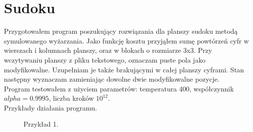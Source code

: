 \documentclass{article}
\begin{document}
    \clearpage
    \section{Sudoku}
        Przygotowałem program poszukujący rozwiązania dla planszy sudoku metodą symulowanego wyżarzania. Jako funkcję kosztu przyjąłem sumę powtórzeń cyfr w wierszach i kolumnach planszy, oraz w blokach o rozmiarze 3x3. Przy wczytywaniu planszy z pliku tekstowego, oznaczam puste pola jako modyfikowalne. Uzupełniam je także brakującymi w całej planszy cyframi. Stan następny wyznaczam zamieniając dowolne dwie modyfikowalne pozycje. \\
        Program testowałem z użyciem parametrów: temperatura 400, współczynnik $alpha = 0.9995$, liczba kroków $10^{12}$.\\
        Przykłady działania programu. 
        \begin{figure}[h!]
            \centering
            \caption{Przykład 1.}
        \end{figure}\\
\end{document}
